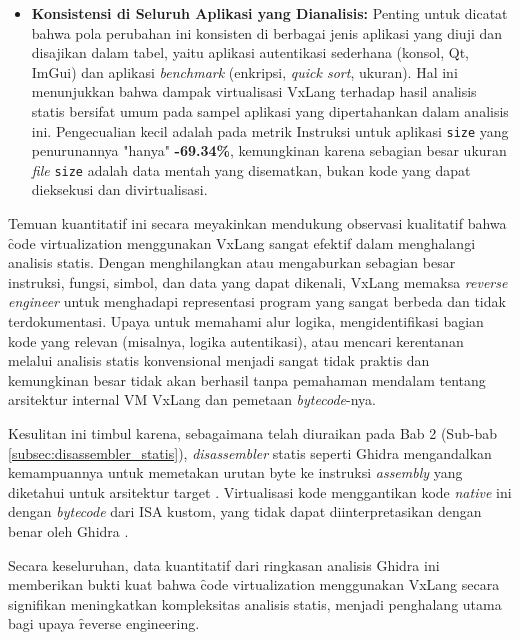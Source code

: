 \begin{itemize}
    \item \textbf{Konsistensi di Seluruh Aplikasi yang Dianalisis:}
    Penting untuk dicatat bahwa pola perubahan ini konsisten di berbagai jenis aplikasi yang diuji dan disajikan dalam tabel, yaitu aplikasi autentikasi sederhana (konsol, Qt, ImGui) dan aplikasi \textit{benchmark} (enkripsi, \textit{quick sort}, ukuran). Hal ini menunjukkan bahwa dampak virtualisasi VxLang terhadap hasil analisis statis bersifat umum pada sampel aplikasi yang dipertahankan dalam analisis ini. Pengecualian kecil adalah pada metrik Instruksi untuk aplikasi \texttt{size} yang penurunannya "hanya" \textbf{-69.34\%}, kemungkinan karena sebagian besar ukuran \textit{file} \texttt{size} adalah data mentah yang disematkan, bukan kode yang dapat dieksekusi dan divirtualisasi.

\end{itemize}

Temuan kuantitatif ini secara meyakinkan mendukung observasi kualitatif bahwa \f{code virtualization} menggunakan VxLang sangat efektif dalam menghalangi analisis statis. Dengan menghilangkan atau mengaburkan sebagian besar instruksi, fungsi, simbol, dan data yang dapat dikenali, VxLang memaksa \textit{reverse engineer} untuk menghadapi representasi program yang sangat berbeda dan tidak terdokumentasi. Upaya untuk memahami alur logika, mengidentifikasi bagian kode yang relevan (misalnya, logika autentikasi), atau mencari kerentanan melalui analisis statis konvensional menjadi sangat tidak praktis dan kemungkinan besar tidak akan berhasil tanpa pemahaman mendalam tentang arsitektur internal VM VxLang dan pemetaan \textit{bytecode}-nya.

Kesulitan ini timbul karena, sebagaimana telah diuraikan pada Bab 2 (Sub-bab \ref{subsec:disassembler_statis}), \textit{disassembler} statis seperti Ghidra mengandalkan kemampuannya untuk memetakan urutan byte ke instruksi \textit{assembly} yang diketahui untuk arsitektur target \cite{Sikorski2012, Eilam2011}. Virtualisasi kode menggantikan kode \textit{native} ini dengan \textit{bytecode} dari ISA kustom, yang tidak dapat diinterpretasikan dengan benar oleh Ghidra \cite{Ko2007}. 

Secara keseluruhan, data kuantitatif dari ringkasan analisis Ghidra ini memberikan bukti kuat bahwa \f{code virtualization} menggunakan VxLang secara signifikan meningkatkan kompleksitas analisis statis, menjadi penghalang utama bagi upaya \f{reverse engineering}.

